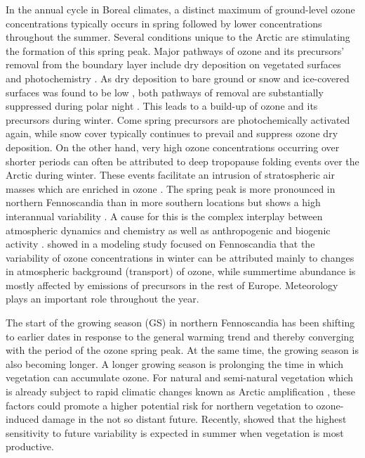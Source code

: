 \documentclass[bg, manuscript]{copernicus}
\begin{document}
In the annual cycle in Boreal climates, a distinct maximum of ground-level ozone concentrations typically occurs in spring followed by lower concentrations throughout the summer. Several conditions unique to the Arctic are stimulating the formation of this spring peak. Major pathways of ozone and its precursors' removal from the boundary layer include dry deposition on vegetated surfaces and photochemistry \citep{RG:Clifton2020}. As dry deposition to bare ground or snow and ice-covered surfaces was found to be low \citep{ACP:Helmig2007}, both pathways of removal are substantially suppressed during polar night \citep{AE:Monks2000}. This leads to a build-up of ozone and its precursors during winter. Come spring precursors are photochemically activated again, while snow cover typically continues to prevail and suppress ozone dry deposition.
On the other hand, very high ozone concentrations occurring over shorter periods can often be attributed to deep tropopause folding events over the Arctic during winter. These events facilitate an intrusion of stratospheric air masses which are enriched in ozone \citep{JGR:Skerlak2015}.
The spring peak is more pronounced in northern Fennoscandia than in more southern locations but shows a  high interannual variability \citep{AB:Klingberg2009, BER:Klingberg2019}. A cause for this is the complex interplay between atmospheric dynamics and chemistry \citep{AE:Laurila1996,BER:Hatakka2003} as well as anthropogenic and biogenic activity \citep{AE:Rummukainen1996,AE:Simpson2002,QJRMS:Galbally2007,NGS:Schnell2009}. \citet{ACP:Andersson2017} showed in a modeling study focused on Fennoscandia that the variability of ozone concentrations in winter can be attributed mainly to changes in atmospheric background (transport) of ozone, while summertime abundance is mostly affected by emissions of precursors in the rest of Europe. Meteorology plays an important role throughout the year.

The start of the growing season (GS) in northern Fennoscandia has been shifting to earlier dates in response to the general warming trend \citep[e.g.]{GCB:Menzel2006,RS:Hogda2013,IJB:Karlsen2007} and thereby converging with the period of the ozone spring peak. At the same time, the growing season is also becoming longer. A longer growing season is prolonging the time in which vegetation can accumulate ozone. For natural and semi-natural vegetation which is already subject to rapid climatic changes known as Arctic amplification \citep{AMAP2012,IPCC2013}, these factors could promote a higher potential risk for northern vegetation to ozone-induced damage in the not so distant future. Recently, \citet{ESPR:Hayes2021} showed that the highest sensitivity to future \chem{[O_3]} variability is expected in summer when vegetation is most productive.
\end{document}
